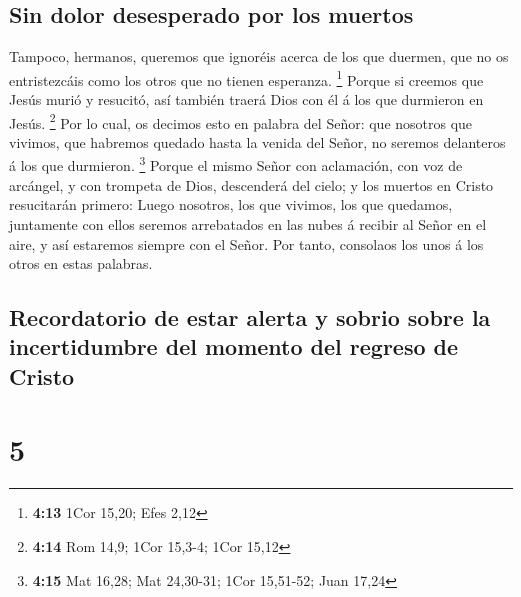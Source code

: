 \hypertarget{sin-dolor-desesperado-por-los-muertos}{%
\subsection{Sin dolor desesperado por los
muertos}\label{sin-dolor-desesperado-por-los-muertos}}

 Tampoco, hermanos, queremos que ignoréis acerca de los
que duermen, que no os entristezcáis como los otros que no tienen
esperanza. \footnote{\textbf{4:13} 1Cor 15,20; Efes 2,12}
 Porque si creemos que Jesús murió y resucitó, así
también traerá Dios con él á los que durmieron en Jesús. \footnote{\textbf{4:14}
  Rom 14,9; 1Cor 15,3-4; 1Cor 15,12}  Por lo cual, os
decimos esto en palabra del Señor: que nosotros que vivimos, que
habremos quedado hasta la venida del Señor, no seremos delanteros á los
que durmieron. \footnote{\textbf{4:15} Mat 16,28; Mat 24,30-31; 1Cor
  15,51-52; Juan 17,24}  Porque el mismo Señor con
aclamación, con voz de arcángel, y con trompeta de Dios, descenderá del
cielo; y los muertos en Cristo resucitarán primero: 
Luego nosotros, los que vivimos, los que quedamos, juntamente con ellos
seremos arrebatados en las nubes á recibir al Señor en el aire, y así
estaremos siempre con el Señor.  Por tanto, consolaos los
unos á los otros en estas palabras.

\hypertarget{recordatorio-de-estar-alerta-y-sobrio-sobre-la-incertidumbre-del-momento-del-regreso-de-cristo}{%
\subsection{Recordatorio de estar alerta y sobrio sobre la incertidumbre
del momento del regreso de
Cristo}\label{recordatorio-de-estar-alerta-y-sobrio-sobre-la-incertidumbre-del-momento-del-regreso-de-cristo}}

\hypertarget{section-4}{%
\section{5}\label{section-4}}

